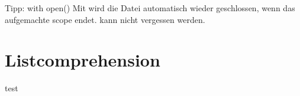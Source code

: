 \begin{frame}{Tipp: with open()}
	Mit  wird die Datei automatisch wieder geschlossen, wenn das aufgemachte scope endet.  kann nicht vergessen werden. 
	
\end{frame}

\section{Listcomprehension}
\begin{frame}{test}
	
\end{frame}


